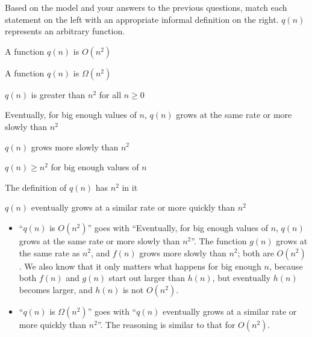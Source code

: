 \documentclass{tufte-handout}
\begin{document}
\begin{questions}
\newpage
\item \label{q:synthesize} Based on the model and your answers to the
  previous questions, match each statement on the left with an
  appropriate informal definition on the right. $q(n)$ represents an
  arbitrary function.  \bigskip

  \begin{fullwidth}
  \begin{center}
  \begin{minipage}{0.4\linewidth}
    A function $q(n)$ is $O(n^2)$ \bigskip

    A function $q(n)$ is $\Omega(n^2)$
  \end{minipage}
  \begin{minipage}{0.4\linewidth}
     $q(n)$ is greater than $n^2$ for all $n \geq 0$ \bigskip

     Eventually, for big enough values of $n$, $q(n)$ grows at
      the same rate or more slowly than $n^2$ \bigskip

     $q(n)$ grows more slowly than $n^2$ \bigskip

     $q(n) \geq n^2$ for big enough values of $n$ \bigskip

     The definition of $q(n)$ has $n^2$ in it \bigskip

    $q(n)$ eventually grows at a similar rate or more quickly
      than $n^2$
  \end{minipage}
  \end{center}
  \end{fullwidth}

  \begin{answer}
    \begin{itemize}
    \item ``$q(n)$ is $O(n^2)$'' goes with ``Eventually, for big enough
      values of $n$, $q(n)$ grows at the same rate or more slowly than
      $n^2$''.  The function $g(n)$ grows at the same rate as $n^2$,
      and $f(n)$ grows more slowly than $n^2$; both are $O(n^2)$.  We
      also know that it only matters what happens for big enough $n$,
      because both $f(n)$ and $g(n)$ start out larger than $h(n)$, but
      eventually $h(n)$ becomes larger, and $h(n)$ is not $O(n^2)$.
    \item ``$q(n)$ is $\Omega(n^2)$'' goes with ``$q(n)$ eventually
      grows at a similar rate or more quickly than $n^2$''.  The
      reasoning is similar to that for $O(n^2)$.
    \end{itemize}
  \end{answer}


\end{questions}
\end{document}
